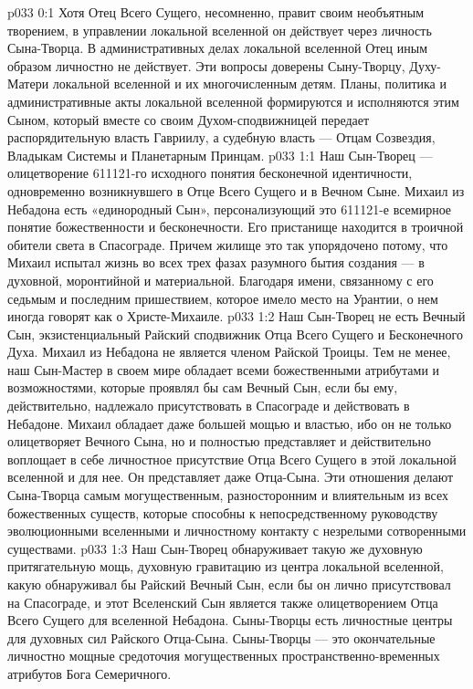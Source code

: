 \author{Глава Архангелов}
\vs p033 0:1 Хотя Отец Всего Сущего, несомненно, правит своим необъятным творением, в управлении локальной вселенной он действует через личность Сына\hyp{}Творца. В административных делах локальной вселенной Отец иным образом личностно не действует. Эти вопросы доверены Сыну\hyp{}Творцу, Духу\hyp{}Матери локальной вселенной и их многочисленным детям. Планы, политика и административные акты локальной вселенной формируются и исполняются этим Сыном, который вместе со своим Духом\hyp{}сподвижницей передает распорядительную власть Гавриилу, а судебную власть --- Отцам Созвездия, Владыкам Системы и Планетарным Принцам.
\vs p033 1:1 Наш Сын\hyp{}Творец --- олицетворение 611121\hyp{}го исходного понятия бесконечной идентичности, одновременно возникнувшего в Отце Всего Сущего и в Вечном Сыне. Михаил из Небадона есть «единородный Сын», персонализующий это 611121\hyp{}е всемирное понятие божественности и бесконечности. Его пристанище находится в троичной обители света в Спасограде. Причем жилище это так упорядочено потому, что Михаил испытал жизнь во всех трех фазах разумного бытия создания --- в духовной, моронтийной и материальной. Благодаря имени, связанному с его седьмым и последним пришествием, которое имело место на Урантии, о нем иногда говорят как о Христе\hyp{}Михаиле.
\vs p033 1:2 Наш Сын\hyp{}Творец не есть Вечный Сын, экзистенциальный Райский сподвижник Отца Всего Сущего и Бесконечного Духа. Михаил из Небадона не является членом Райской Троицы. Тем не менее, наш Сын\hyp{}Мастер в своем мире обладает всеми божественными атрибутами и возможностями, которые проявлял бы сам Вечный Сын, если бы ему, действительно, надлежало присутствовать в Спасограде и действовать в Небадоне. Михаил обладает даже большей мощью и властью, ибо он не только олицетворяет Вечного Сына, но и полностью представляет и действительно воплощает в себе личностное присутствие Отца Всего Сущего в этой локальной вселенной и для нее. Он представляет даже Отца\hyp{}Сына. Эти отношения делают Сына\hyp{}Творца самым могущественным, разносторонним и влиятельным из всех божественных существ, которые способны к непосредственному руководству эволюционными вселенными и личностному контакту с незрелыми сотворенными существами.
\vs p033 1:3 Наш Сын\hyp{}Творец обнаруживает такую же духовную притягательную мощь, духовную гравитацию из центра локальной вселенной, какую обнаруживал бы Райский Вечный Сын, если бы он лично присутствовал на Спасограде, и  этот Вселенский Сын является также олицетворением Отца Всего Сущего для вселенной Небадона. Сыны\hyp{}Творцы есть личностные центры для духовных сил Райского Отца\hyp{}Сына. Сыны\hyp{}Творцы --- это окончательные личностно мощные средоточия могущественных пространственно\hyp{}временных атрибутов Бога Семеричного.
